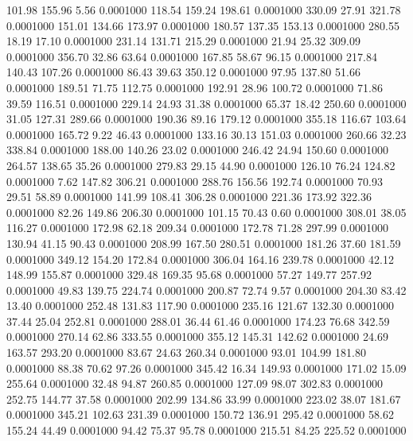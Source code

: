  101.98  155.96    5.56   0.0001000
 118.54  159.24  198.61   0.0001000
 330.09   27.91  321.78   0.0001000
 151.01  134.66  173.97   0.0001000
 180.57  137.35  153.13   0.0001000
 280.55   18.19   17.10   0.0001000
 231.14  131.71  215.29   0.0001000
  21.94   25.32  309.09   0.0001000
 356.70   32.86   63.64   0.0001000
 167.85   58.67   96.15   0.0001000
 217.84  140.43  107.26   0.0001000
  86.43   39.63  350.12   0.0001000
  97.95  137.80   51.66   0.0001000
 189.51   71.75  112.75   0.0001000
 192.91   28.96  100.72   0.0001000
  71.86   39.59  116.51   0.0001000
 229.14   24.93   31.38   0.0001000
  65.37   18.42  250.60   0.0001000
  31.05  127.31  289.66   0.0001000
 190.36   89.16  179.12   0.0001000
 355.18  116.67  103.64   0.0001000
 165.72    9.22   46.43   0.0001000
 133.16   30.13  151.03   0.0001000
 260.66   32.23  338.84   0.0001000
 188.00  140.26   23.02   0.0001000
 246.42   24.94  150.60   0.0001000
 264.57  138.65   35.26   0.0001000
 279.83   29.15   44.90   0.0001000
 126.10   76.24  124.82   0.0001000
   7.62  147.82  306.21   0.0001000
 288.76  156.56  192.74   0.0001000
  70.93   29.51   58.89   0.0001000
 141.99  108.41  306.28   0.0001000
 221.36  173.92  322.36   0.0001000
  82.26  149.86  206.30   0.0001000
 101.15   70.43    0.60   0.0001000
 308.01   38.05  116.27   0.0001000
 172.98   62.18  209.34   0.0001000
 172.78   71.28  297.99   0.0001000
 130.94   41.15   90.43   0.0001000
 208.99  167.50  280.51   0.0001000
 181.26   37.60  181.59   0.0001000
 349.12  154.20  172.84   0.0001000
 306.04  164.16  239.78   0.0001000
  42.12  148.99  155.87   0.0001000
 329.48  169.35   95.68   0.0001000
  57.27  149.77  257.92   0.0001000
  49.83  139.75  224.74   0.0001000
 200.87   72.74    9.57   0.0001000
 204.30   83.42   13.40   0.0001000
 252.48  131.83  117.90   0.0001000
 235.16  121.67  132.30   0.0001000
  37.44   25.04  252.81   0.0001000
 288.01   36.44   61.46   0.0001000
 174.23   76.68  342.59   0.0001000
 270.14   62.86  333.55   0.0001000
 355.12  145.31  142.62   0.0001000
  24.69  163.57  293.20   0.0001000
  83.67   24.63  260.34   0.0001000
  93.01  104.99  181.80   0.0001000
  88.38   70.62   97.26   0.0001000
 345.42   16.34  149.93   0.0001000
 171.02   15.09  255.64   0.0001000
  32.48   94.87  260.85   0.0001000
 127.09   98.07  302.83   0.0001000
 252.75  144.77   37.58   0.0001000
 202.99  134.86   33.99   0.0001000
 223.02   38.07  181.67   0.0001000
 345.21  102.63  231.39   0.0001000
 150.72  136.91  295.42   0.0001000
  58.62  155.24   44.49   0.0001000
  94.42   75.37   95.78   0.0001000
 215.51   84.25  225.52   0.0001000
